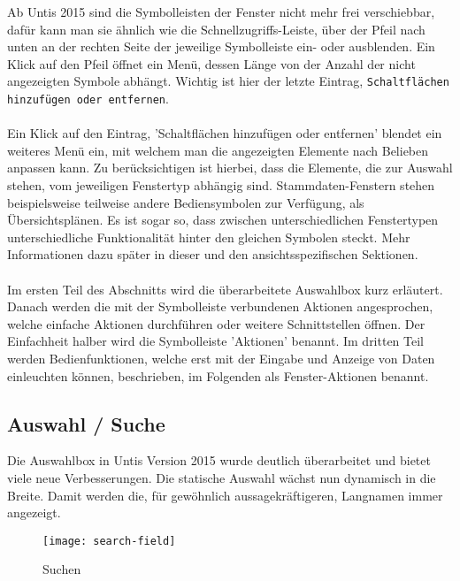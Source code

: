 Ab Untis 2015 sind die Symbolleisten der Fenster nicht mehr frei verschiebbar, dafür kann man sie ähnlich wie die Schnellzugriffs-Leiste, über der Pfeil nach unten an der rechten Seite der jeweilige Symbolleiste ein- oder ausblenden. Ein Klick auf den Pfeil öffnet ein Menü, dessen Länge von der Anzahl der nicht angezeigten Symbole abhängt. Wichtig ist hier der letzte Eintrag, \texttt{Schaltflächen hinzufügen oder entfernen}.\\
\\
Ein Klick auf den Eintrag, 'Schaltflächen hinzufügen oder entfernen' blendet ein weiteres Menü ein, mit welchem man die angezeigten Elemente nach Belieben anpassen kann. Zu berücksichtigen ist hierbei, dass die Elemente, die zur Auswahl stehen, vom jeweiligen Fenstertyp abhängig sind. Stammdaten-Fenstern stehen beispielsweise teilweise andere Bediensymbolen zur Verfügung, als Übersichtsplänen. Es ist sogar so, dass zwischen unterschiedlichen Fenstertypen unterschiedliche Funktionalität hinter den gleichen Symbolen steckt. Mehr Informationen dazu später in dieser und den ansichtsspezifischen Sektionen.\\
\\
Im ersten Teil des Abschnitts wird die überarbeitete Auswahlbox kurz erläutert. Danach werden die mit der Symbolleiste verbundenen Aktionen angesprochen, welche einfache Aktionen durchführen oder weitere Schnittstellen öffnen. Der Einfachheit halber wird die Symbolleiste 'Aktionen' benannt. Im dritten Teil werden Bedienfunktionen, welche erst mit der Eingabe und Anzeige von Daten einleuchten können, beschrieben, im Folgenden als Fenster-Aktionen benannt.

\subsection{Auswahl / Suche}

Die Auswahlbox in Untis Version 2015 wurde deutlich überarbeitet und bietet viele neue Verbesserungen. Die statische Auswahl wächst nun dynamisch in die Breite. Damit werden die, für gewöhnlich aussagekräftigeren, Langnamen immer angezeigt.\\

\begin{wrapfigure}{r}{.4\textwidth}
	\vspace{-19pt}
	\texttt{[image: search-field]}
	\vspace{-5pt}
	\caption{Suchen}
	\label{fig:search-field}
	\vspace{-15pt}
\end{wrapfigure}

